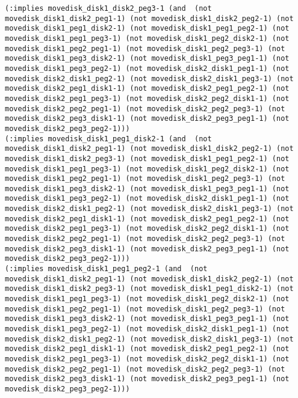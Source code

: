 \documentclass[12pt,letterpaper]{ntdhw}
\begin{document}
\begin{enumerate}
\begin{enumerate}
\begin{lstlisting}[language=pddl, style=pddlstyle,
  basicstyle=\scriptsize]
(:implies movedisk_disk1_disk2_peg3-1 (and  (not movedisk_disk1_disk2_peg1-1) (not movedisk_disk1_disk2_peg2-1) (not movedisk_disk1_peg1_disk2-1) (not movedisk_disk1_peg1_peg2-1) (not movedisk_disk1_peg1_peg3-1) (not movedisk_disk1_peg2_disk2-1) (not movedisk_disk1_peg2_peg1-1) (not movedisk_disk1_peg2_peg3-1) (not movedisk_disk1_peg3_disk2-1) (not movedisk_disk1_peg3_peg1-1) (not movedisk_disk1_peg3_peg2-1) (not movedisk_disk2_disk1_peg1-1) (not movedisk_disk2_disk1_peg2-1) (not movedisk_disk2_disk1_peg3-1) (not movedisk_disk2_peg1_disk1-1) (not movedisk_disk2_peg1_peg2-1) (not movedisk_disk2_peg1_peg3-1) (not movedisk_disk2_peg2_disk1-1) (not movedisk_disk2_peg2_peg1-1) (not movedisk_disk2_peg2_peg3-1) (not movedisk_disk2_peg3_disk1-1) (not movedisk_disk2_peg3_peg1-1) (not movedisk_disk2_peg3_peg2-1)))
(:implies movedisk_disk1_peg1_disk2-1 (and  (not movedisk_disk1_disk2_peg1-1) (not movedisk_disk1_disk2_peg2-1) (not movedisk_disk1_disk2_peg3-1) (not movedisk_disk1_peg1_peg2-1) (not movedisk_disk1_peg1_peg3-1) (not movedisk_disk1_peg2_disk2-1) (not movedisk_disk1_peg2_peg1-1) (not movedisk_disk1_peg2_peg3-1) (not movedisk_disk1_peg3_disk2-1) (not movedisk_disk1_peg3_peg1-1) (not movedisk_disk1_peg3_peg2-1) (not movedisk_disk2_disk1_peg1-1) (not movedisk_disk2_disk1_peg2-1) (not movedisk_disk2_disk1_peg3-1) (not movedisk_disk2_peg1_disk1-1) (not movedisk_disk2_peg1_peg2-1) (not movedisk_disk2_peg1_peg3-1) (not movedisk_disk2_peg2_disk1-1) (not movedisk_disk2_peg2_peg1-1) (not movedisk_disk2_peg2_peg3-1) (not movedisk_disk2_peg3_disk1-1) (not movedisk_disk2_peg3_peg1-1) (not movedisk_disk2_peg3_peg2-1)))
(:implies movedisk_disk1_peg1_peg2-1 (and  (not movedisk_disk1_disk2_peg1-1) (not movedisk_disk1_disk2_peg2-1) (not movedisk_disk1_disk2_peg3-1) (not movedisk_disk1_peg1_disk2-1) (not movedisk_disk1_peg1_peg3-1) (not movedisk_disk1_peg2_disk2-1) (not movedisk_disk1_peg2_peg1-1) (not movedisk_disk1_peg2_peg3-1) (not movedisk_disk1_peg3_disk2-1) (not movedisk_disk1_peg3_peg1-1) (not movedisk_disk1_peg3_peg2-1) (not movedisk_disk2_disk1_peg1-1) (not movedisk_disk2_disk1_peg2-1) (not movedisk_disk2_disk1_peg3-1) (not movedisk_disk2_peg1_disk1-1) (not movedisk_disk2_peg1_peg2-1) (not movedisk_disk2_peg1_peg3-1) (not movedisk_disk2_peg2_disk1-1) (not movedisk_disk2_peg2_peg1-1) (not movedisk_disk2_peg2_peg3-1) (not movedisk_disk2_peg3_disk1-1) (not movedisk_disk2_peg3_peg1-1) (not movedisk_disk2_peg3_peg2-1)))

\end{lstlisting}
\end{enumerate}
\end{enumerate}
\end{document}
